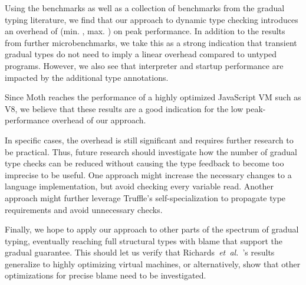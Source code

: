 Using the \AWFY benchmarks as well as a collection of benchmarks from the
gradual typing literature, we find that our approach to dynamic type checking
introduces an overhead of 
\OverheadTypingGMeanP (min. \OverheadTypingMinP, max. \OverheadTypingMaxP)
on peak performance.
In addition to the results from further microbenchmarks,
we take this as a strong indication that transient gradual types do not
need to imply a linear overhead compared to untyped programs.
However, we also see that interpreter and startup performance are
impacted by the additional type annotations.

  
  

Since Moth reaches the performance of a
highly optimized JavaScript VM such as V8,
we believe that these results are a good indication
for the low peak-performance overhead of our approach.


In specific cases, the overhead is still significant and requires further
research to be practical. Thus, future research should investigate how the
number of gradual type checks can be reduced without causing
the type feedback to become too imprecise to be useful.
One approach might increase the necessary changes to a language implementation,
but avoid checking every variable read.
Another approach might further leverage Truffle's self-specialization
to propagate type requirements and avoid unnecessary checks.

Finally, we hope to apply our approach to other parts of the spectrum
of gradual typing, eventually reaching 
full structural types with
blame that support the gradual guarantee.  
This should let us verify that
Richards~\textit{et~al.}~\cite{Richards2017}'s results generalize to highly optimizing virtual
machines, or alternatively, show that other optimizations for precise
blame need to be investigated.

